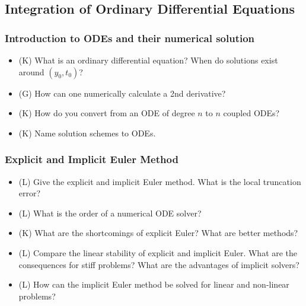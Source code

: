 \subsection*{Integration of Ordinary Differential Equations}

\subsubsection*{Introduction to ODEs and their numerical solution}
\begin{itemize}
    \item (K) What is an ordinary differential equation? When do solutions exist around $(y_0, t_0)$?
    \answerboxS
    \item (G) How can one numerically calculate a 2nd derivative?
    \answerboxS
    \item (K) How do you convert from an ODE of degree $n$ to $n$ coupled ODEs?
    \answerboxM
    \item (K) Name solution schemes to ODEs.
    \answerboxS
\end{itemize}

\subsubsection*{Explicit and Implicit Euler Method}
\begin{itemize}
    \item (L) Give the explicit and implicit Euler method. What is the local truncation error?
    \answerboxM
    \item (L) What is the order of a numerical ODE solver?
    \answerboxS
    \item (K) What are the shortcomings of explicit Euler? What are better methods?
    \answerboxM
    \item (L) Compare the linear stability of explicit and implicit Euler. What are the consequences for stiff problems? What are the advantages of implicit solvers?
    \answerboxL
    \item (L) How can the implicit Euler method be solved for linear and non-linear problems?
    \answerboxM
\end{itemize}

